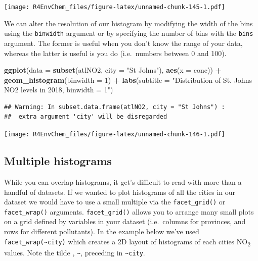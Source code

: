 \documentclass[
]{book}
\newenvironment{Shaded}{\begin{snugshade}}{\end{snugshade}}
\newcommand{\AttributeTok}[1]{\textcolor[rgb]{0.13,0.29,0.53}{#1}}
\newcommand{\DecValTok}[1]{\textcolor[rgb]{0.00,0.00,0.81}{#1}}
\newcommand{\FunctionTok}[1]{\textcolor[rgb]{0.13,0.29,0.53}{\textbf{#1}}}
\newcommand{\NormalTok}[1]{#1}
\newcommand{\SpecialCharTok}[1]{\textcolor[rgb]{0.81,0.36,0.00}{\textbf{#1}}}
\newcommand{\StringTok}[1]{\textcolor[rgb]{0.31,0.60,0.02}{#1}}
\begin{document}
\texttt{[image: R4EnvChem\_files/figure-latex/unnamed-chunk-145-1.pdf]}

We can alter the resolution of our histogram by modifying the width of the bins using the \texttt{binwidth} argument or by specifying the number of bins with the \texttt{bins} argument. The former is useful when you don't know the range of your data, whereas the latter is useful is you do (i.e.~numbers between 0 and 100).

\begin{Shaded}
\begin{Highlighting}[]
\FunctionTok{ggplot}\NormalTok{(}\AttributeTok{data =} \FunctionTok{subset}\NormalTok{(atlNO2, }\AttributeTok{city =} \StringTok{"St Johns"}\NormalTok{), }
       \FunctionTok{aes}\NormalTok{(}\AttributeTok{x =}\NormalTok{ conc)) }\SpecialCharTok{+}
  \FunctionTok{geom\_histogram}\NormalTok{(}\AttributeTok{binwidth =} \DecValTok{1}\NormalTok{) }\SpecialCharTok{+}
  \FunctionTok{labs}\NormalTok{(}\AttributeTok{subtitle =} \StringTok{"Distribution of St. Johns\textquotesingle{} NO2 levels in 2018, binwidth = 1"}\NormalTok{)}
\end{Highlighting}
\end{Shaded}

\begin{verbatim}
## Warning: In subset.data.frame(atlNO2, city = "St Johns") :
##  extra argument 'city' will be disregarded
\end{verbatim}

\texttt{[image: R4EnvChem\_files/figure-latex/unnamed-chunk-146-1.pdf]}

\hypertarget{multiple-histograms}{%
\subsection{Multiple histograms}\label{multiple-histograms}}

While you can overlap histograms, it get's difficult to read with more than a handful of datasets. If we wanted to plot histograms of all the cities in our dataset we would have to use a small multiple via the \texttt{facet\_grid()} or \texttt{facet\_wrap()} arguments. \texttt{facet\_grid()} allows you to arrange many small plots on a grid defined by variables in your dataset (i.e.~columns for provinces, and rows for different pollutants). In the example below we've used \texttt{facet\_wrap(\textasciitilde{}city)} which creates a 2D layout of histograms of each cities NO\textsubscript{2} values. Note the tilde , \texttt{\textasciitilde{}}, preceding in \texttt{\textasciitilde{}city}.
\end{document}
